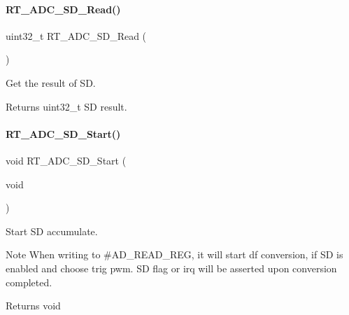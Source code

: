 \paragraph{\texorpdfstring{R\+T\+\_\+\+A\+D\+C\+\_\+\+S\+D\+\_\+\+Read()}{RT\_ADC\_SD\_Read()}}
{\footnotesize\ttfamily uint32\+\_\+t R\+T\+\_\+\+A\+D\+C\+\_\+\+S\+D\+\_\+\+Read (\begin{DoxyParamCaption}{ }\end{DoxyParamCaption})}



Get the result of SD. 

\begin{DoxyReturn}{Returns}
uint32\+\_\+t SD result. 
\end{DoxyReturn}
\mbox{\label{a00002_ac75cab97ce7cce47671dd8ef34e920d8}} 
\paragraph{\texorpdfstring{R\+T\+\_\+\+A\+D\+C\+\_\+\+S\+D\+\_\+\+Start()}{RT\_ADC\_SD\_Start()}}
{\footnotesize\ttfamily void R\+T\+\_\+\+A\+D\+C\+\_\+\+S\+D\+\_\+\+Start (\begin{DoxyParamCaption}\item[{void}]{ }\end{DoxyParamCaption})\hspace{0.3cm}{\ttfamily [inline]}}



Start SD accumulate. 

\begin{DoxyNote}{Note}
When writing to \#\+A\+D\+\_\+\+R\+E\+A\+D\+\_\+\+R\+EG, it will start df conversion, if SD is enabled and choose trig pwm. SD flag or irq will be asserted upon conversion completed. 
\end{DoxyNote}
\begin{DoxyReturn}{Returns}
void 
\end{DoxyReturn}
\mbox{\label{a00002_a99cb1f9dcaee38a9ce2bd5e9eca49f33}} 
